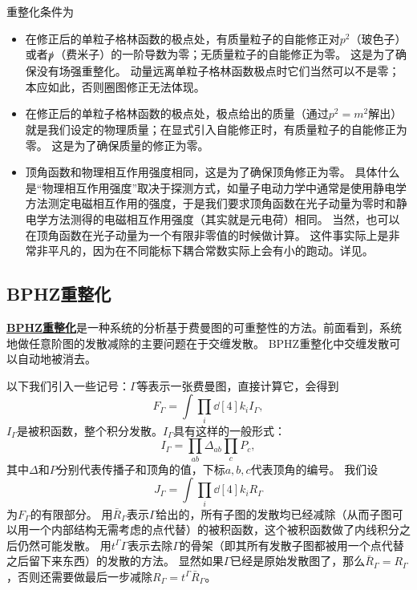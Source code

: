 \documentclass[hyperref, UTF8, a4paper]{ctexart}
\renewcommand{\autoref}{\prettyref}
\newcommand{\concept}[1]{\underline{\textbf{#1}}}
\begin{document}
重整化条件为
\begin{itemize}
    \item 在修正后的单粒子格林函数的极点处，有质量粒子的自能修正对$p^2$（玻色子）或者$\slashed{p}$（费米子）的一阶导数为零；无质量粒子的自能修正为零。
    这是为了确保没有场强重整化。
    动量远离单粒子格林函数极点时它们当然可以不是零；本应如此，否则圈图修正无法体现。
    \item 在修正后的单粒子格林函数的极点处，极点给出的质量（通过$p^2=m^2$解出）就是我们设定的物理质量；在显式引入自能修正时，有质量粒子的自能修正为零。
    这是为了确保质量的修正为零。
    \item 顶角函数和物理相互作用强度相同，这是为了确保顶角修正为零。
    具体什么是“物理相互作用强度”取决于探测方式，如量子电动力学中通常是使用静电学方法测定电磁相互作用的强度，于是我们要求顶角函数在光子动量为零时和静电学方法测得的电磁相互作用强度（其实就是元电荷）相同。
    当然，也可以在顶角函数在光子动量为一个有限非零值的时候做计算。
    这件事实际上是非常非平凡的，因为在不同能标下耦合常数实际上会有小的跑动。详见\autoref{sec:rg}。
\end{itemize}

\subsection{BPHZ重整化}\label{sec:bphz}

\concept{BPHZ重整化}是一种系统的分析基于费曼图的可重整性的方法。前面看到，系统地做任意阶图的发散减除的主要问题在于交缠发散。
BPHZ重整化中交缠发散可以自动地被消去。

以下我们引入一些记号：$\Gamma$等表示一张费曼图，直接计算它，会得到
\begin{equation}
    F_\Gamma = \int \prod_i \dd[4]{k_i} I_\Gamma,
\end{equation}
$I_\Gamma$是被积函数，整个积分发散。$I_\Gamma$具有这样的一般形式：
\begin{equation}
    I_\Gamma = \prod_{ab} \Delta_{ab} \prod_c P_c,
\end{equation}
其中$\Delta$和$P$分别代表传播子和顶角的值，下标$a, b, c$代表顶角的编号。
我们设
\begin{equation}
    J_\Gamma = \int \prod_i \dd[4]{k_i} R_\Gamma
\end{equation}
为$F_\Gamma$的有限部分。
用$\bar{R}_\Gamma$表示$\Gamma$给出的，所有子图的发散均已经减除（从而子图可以用一个内部结构无需考虑的点代替）的被积函数，这个被积函数做了内线积分之后仍然可能发散。
用$t^\Gamma \Gamma$表示去除$\Gamma$的骨架（即其所有发散子图都被用一个点代替之后留下来东西）的发散的方法。
显然如果$\Gamma$已经是原始发散图了，那么$\bar{R}_\Gamma = R_\Gamma$，否则还需要做最后一步减除$R_\Gamma = t^\Gamma \bar{R}_\Gamma$。
\end{document}
